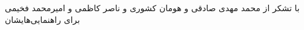 \documentclass[]{article}
\begin{document}
\printheader
با تشکر از محمد مهدی صادقی و هومان کشوری و ناصر کاظمی و امیرمحمد فخیمی برای راهنمایی‌هایشان



\end{document}

